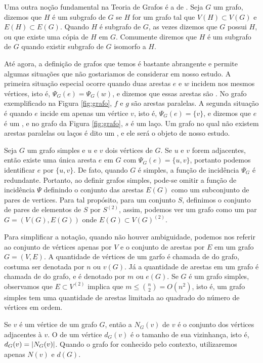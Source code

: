 Uma outra noção fundamental na Teoria de Grafos é a de . Seja $G$ um grafo, dizemos que $H$ é um subgrafo de $G$ se $H$ for um grafo tal que $V(H) \subset V(G)$ e $E(H) \subset E(G)$. Quando $H$ é subgrafo de $G$, as vezes dizemos que $G$ possui $H$, ou que existe uma cópia de $H$ em $G$. Comumente diremos que $H$ é um subgrafo de $G$ quando existir subgrafo de $G$ isomorfo a $H$.

Até agora, a definição de grafos que temos é bastante abrangente e permite algumas situações que não gostariamos de considerar em nosso estudo. A primeira situação especial ocorre quando duas arestas $e$ e $w$ incidem nos mesmos vértices, isto é, $\Psi_G(e) = \Psi_G(w)$, e dizemos que essas arestas são . No grafo exemplificado na Figura \ref{fig:grafo}, $f$ e $g$ são arestas paralelas. A segunda situação é quando $e$ incide em apenas um vértice $v$, isto é, $\Psi_G(e) = \{v\}$, e dizemos que $e$ é um , e no grafo da Figura \ref{fig:grafo}, $s$ é um laço. Um grafo no qual não existem arestas paralelas ou laços é dito um , e ele será o objeto de nosso estudo.


Seja $G$ um grafo simples e $u$ e $v$ dois vértices de $G$. Se $u$ e $v$ forem adjacentes, então existe uma única aresta $e$ em $G$ com $\Psi_G(e) = \{u,v\}$, portanto podemos identificar $e$ por $\{u,v\}$. De fato, quando $G$ é simples, a função de incidência $\Psi_G$ é redundante. Portanto, ao definir grafos simples, pode-se omitir a função de incidência $\Psi$ definindo o conjunto das arestas $E(G)$ como um subconjunto de pares de vertices. Para tal propósito, para um conjunto $S$, definimos o conjunto de pares de elementos de $S$ por $S^{(2)}$, assim, podemos ver um grafo como um par $G = (V(G),E(G))$ onde $E(G) \subset V(G)^{(2)}$.

Para simplificar a notação, quando não houver ambiguidade, podemos nos referir ao conjunto de vértices apenas por $V$ e o conjunto de arestas por $E$ em um grafo $G = (V,E)$. A quantidade de vértices de um garfo é chamada de  do grafo, costuma ser denotada por $n$ ou $v(G)$. Já a quantidade de arestas em um grafo é chamada de  do grafo, e é denotado por $m$ ou $e(G)$. Se $G$ é um grafo simples, observamos que $E \subset V^{(2)}$ implica que $m \leq \binom{n}{2} = O(n^2)$, isto é, um grafo simples tem uma quantidade de arestas limitada ao quadrado do número de vértices em ordem.

Se $v$ é um vértice de um grafo $G$, então a  $N_G(v)$ de $v$ é o conjunto dos vértices adjacentes à $v$. O  de um vértice $d_G(v)$ é o tamanho de sua vizinhança, isto é, $d_G(v) = \left | N_G(v) \right |$. Quando o grafo for conhecido pelo contexto, utilizaremos apenas $N(v)$ e $d(G)$.

